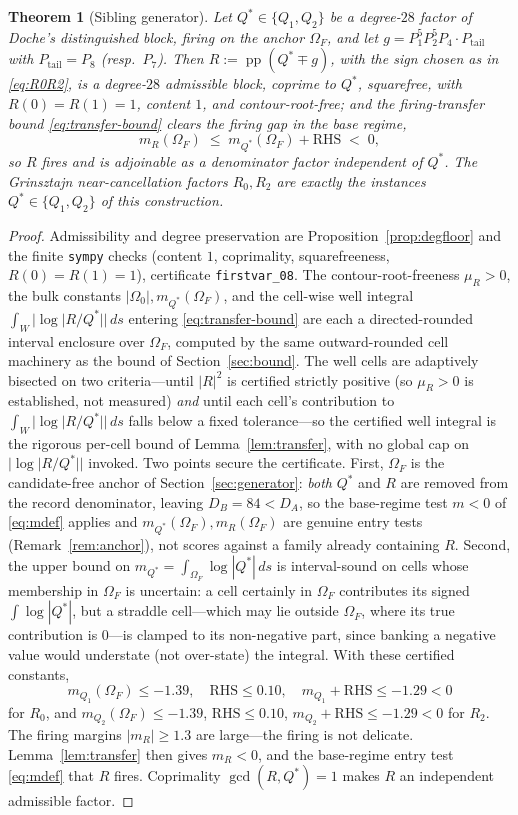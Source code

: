 \documentclass[11pt,reqno]{amsart}
\theoremstyle{plain}
\newtheorem{theorem}{Theorem}
\theoremstyle{definition}
\newcommand{\dA}{D_A}
\newcommand{\dB}{D_B}
\DeclareMathOperator{\pp}{pp}
\begin{document}
\begin{theorem}[Sibling generator]\label{thm:generator}
Let $Q^*\in\{Q_1,Q_2\}$ be a degree-$28$ factor of Doche's distinguished block, firing
on the anchor $\Omega_F$, and let $g=P_1^5P_2^5P_4\cdot P_{\mathrm{tail}}$ with
$P_{\mathrm{tail}}=P_8$ (resp.\ $P_7$). Then $R:=\pp(Q^*\mp g)$, with the sign chosen as
in \eqref{eq:R0R2}, is a degree-$28$ admissible block, coprime to $Q^*$, squarefree,
with $R(0)=R(1)=1$, content $1$, and contour-root-free; and the firing-transfer bound
\eqref{eq:transfer-bound} clears the firing gap in the base regime,
\[
  m_R(\Omega_F)\;\le\;m_{Q^*}(\Omega_F)+\mathrm{RHS}\;<\;0 ,
\]
so $R$ fires and is adjoinable as a denominator factor independent of $Q^*$. The
Grinsztajn near-cancellation factors $R_0,R_2$ are exactly the instances
$Q^*\in\{Q_1,Q_2\}$ of this construction.
\end{theorem}

\begin{proof}
Admissibility and degree preservation are Proposition~\ref{prop:degfloor} and the
finite \texttt{sympy} checks (content $1$, coprimality, squarefreeness, $R(0)=R(1)=1$),
certificate \texttt{firstvar\_08}. The contour-root-freeness $\mu_R>0$, the bulk
constants $|\Omega_0|,m_{Q^*}(\Omega_F)$, and the cell-wise well integral
$\int_W|\log|R/Q^*||\,ds$ entering \eqref{eq:transfer-bound} are each a directed-rounded
interval enclosure over $\Omega_F$, computed by the same outward-rounded cell machinery
as the bound of Section~\ref{sec:bound}. The well cells are adaptively bisected on two
criteria---until $|R|^2$ is certified strictly positive (so $\mu_R>0$ is established, not
measured) \emph{and} until each cell's contribution to $\int_W|\log|R/Q^*||\,ds$ falls
below a fixed tolerance---so the certified well integral is the rigorous per-cell bound
of Lemma~\ref{lem:transfer}, with no global cap on $|\log|R/Q^*||$ invoked. Two points
secure the certificate. First, $\Omega_F$ is the candidate-free anchor of
Section~\ref{sec:generator}: \emph{both} $Q^*$ and $R$ are removed from the record
denominator, leaving $\dB=84<\dA$, so the base-regime test $m<0$ of \eqref{eq:mdef}
applies and $m_{Q^*}(\Omega_F),m_R(\Omega_F)$ are genuine entry tests
(Remark~\ref{rem:anchor}), not scores against a family already containing $R$. Second,
the upper bound on $m_{Q^*}=\int_{\Omega_F}\log|Q^*|\,ds$ is interval-sound on cells
whose membership in $\Omega_F$ is uncertain: a cell certainly in $\Omega_F$ contributes
its signed $\int\log|Q^*|$, but a straddle cell---which may lie outside $\Omega_F$, where
its true contribution is $0$---is clamped to its non-negative part, since banking a
negative value would understate (not over-state) the integral. With these
certified constants,
\[
  m_{Q_1}(\Omega_F)\le-1.39,\quad \mathrm{RHS}\le0.10,\quad
  m_{Q_1}+\mathrm{RHS}\le-1.29<0
\]
for $R_0$, and $m_{Q_2}(\Omega_F)\le-1.39$, $\mathrm{RHS}\le0.10$,
$m_{Q_2}+\mathrm{RHS}\le-1.29<0$ for $R_2$. The firing margins $|m_R|\ge1.3$ are
large---the firing is not delicate. Lemma~\ref{lem:transfer} then gives $m_R<0$, and the
base-regime entry test \eqref{eq:mdef} that $R$ fires. Coprimality $\gcd(R,Q^*)=1$ makes
$R$ an independent admissible factor.
\end{proof}
\end{document}
